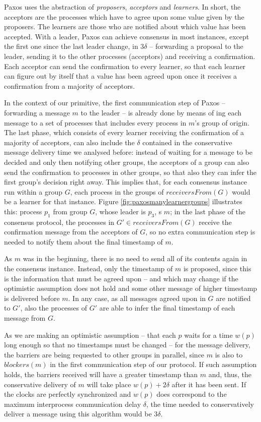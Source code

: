 \documentclass[times, 10pt]{article}
\begin{document}
Paxos uses the abstraction of \emph{proposers}, \emph{acceptors} and \emph{learners}. In short, the acceptors are the processes which have to agree upon some value given by the proposers. The learners are those who are notified about which value has been accepted. With a leader, Paxos can achieve consensus in most instances, except the first one since the last leader change, in $3\delta$ -- forwarding a proposal to the leader, sending it to the other processes (acceptors) and receiving a confirmation. Each acceptor can send the confirmation to every learner, so that each learner can figure out by itself that a value has been agreed upon once it receives a confirmation from a majority of acceptors.

In the context of our \amcast{} primitive, the first communication step of Paxos -- forwarding a message $m$ to the leader -- is already done by means of \rmcast{}ing each message to a set of processes that includes every process in $m$'s group of origin. The last phase, which consists of every learner receiving the confirmation of a majority of acceptors, can also include the $\delta$ contained in the conservative message delivery time we analysed before: instead of waiting for a message to be decided and only then notifying other groups, the acceptors of a group can also send the confirmation to processes in other groups, so that also they can infer the first group's decision right away. This implies that, for each consensus instance run within a group $G$, each process in the groups of $receiversFrom(G)$ would be a learner for that instance. Figure \ref{fig:paxosmanylearnergroups} illustrates this: process $p_1$ from group $G$, whose leader is $p_3$, \amcast{}s $m$; in the last phase of the consensus protocol, the processes in $G' \in receiversFrom(G)$ receive the confirmation message from the acceptors of $G$, so no extra communication step is needed to notify them about the final timestamp of $m$.

As $m$ was \rmcast{} in the beginning, there is no need to send all of its contents again in the consensus instance. Instead, only the timestamp of $m$ is proposed, since this is the information that must be agreed upon -- and which may change if the optimistic assumption does not hold and some other message of higher timestamp is delivered before $m$. In any case, as all messages agreed upon in $G$ are notified to $G'$, also the processes of $G'$ are able to infer the final timestamp of each message from $G$.

As we are making an optimistic assumption -- that each $p$ waits for a time $w(p)$ long enough so that no timestamps must be changed -- for the message delivery, the barriers are being requested to other groups in parallel, since $m$ is also \rmcast{} to $blockers(m)$ in the first communication step of our protocol. If such assumption holds, the barriers received will have a greater timestamp than $m$ and, thus, the conservative delivery of $m$ will take place $w(p) + 2\delta$ after it has been sent. If the clocks are perfectly synchronized and $w(p)$ does correspond to the maximum interprocess communication delay $\delta$, the time needed to conservatively deliver a message using this algorithm would be $3\delta$.
\end{document}
